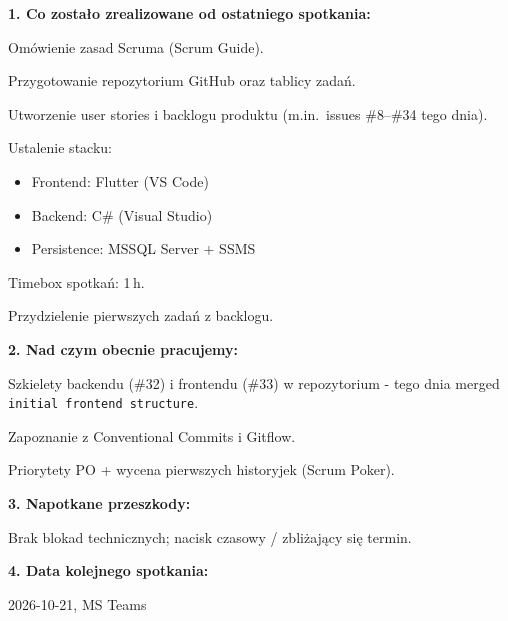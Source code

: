 \documentclass[a4paper,12pt]{article}
\begin{document}

\nextitem
\textbf{1. Co zostało zrealizowane od ostatniego spotkania:}
\par\vspace{0.3cm}
Omówienie zasad Scruma (Scrum Guide).

Przygotowanie repozytorium GitHub oraz tablicy zadań.

Utworzenie user stories i backlogu produktu (m.in.\ issues \#8--\#34 tego dnia).

Ustalenie stacku:
\begin{itemize}[nosep]
  \item Frontend: Flutter (VS Code)
  \item Backend: C\# (Visual Studio)
  \item Persistence: MSSQL Server + SSMS
\end{itemize}

Timebox spotkań: 1\,h.

Przydzielenie pierwszych zadań z backlogu.

\nextitem
\textbf{2. Nad czym obecnie pracujemy:}
\par\vspace{0.3cm}
Szkielety backendu (\#32) i frontendu (\#33) w repozytorium - tego dnia merged \texttt{initial frontend structure}.

Zapoznanie z Conventional Commits i Gitflow.

Priorytety PO + wycena pierwszych historyjek (Scrum Poker).

\nextitem
\textbf{3. Napotkane przeszkody:}
\par\vspace{0.3cm}
Brak blokad technicznych; nacisk czasowy / zbliżający się termin.

\nextitem
\textbf{4. Data kolejnego spotkania:}
\par\vspace{0.3cm}
2026-10-21, MS Teams
\end{document}
